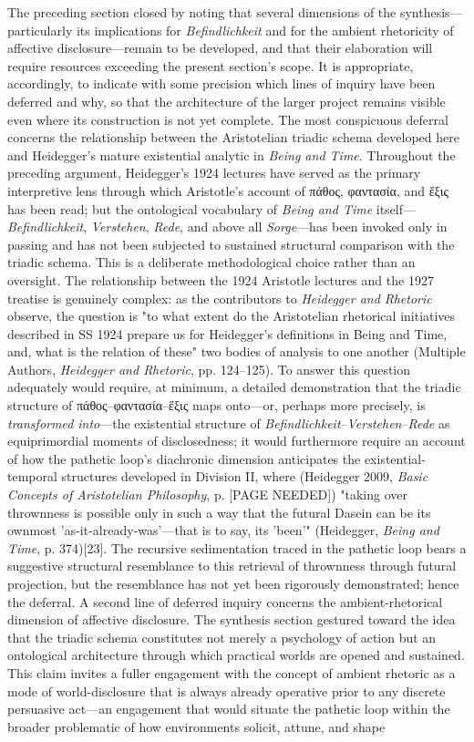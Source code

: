 \documentclass{article}
\begin{document}
The preceding section closed by noting that several dimensions of the synthesis—particularly its implications for \textit{Befindlichkeit} and for the ambient rhetoricity of affective disclosure—remain to be developed, and that their elaboration will require resources exceeding the present section's scope. It is appropriate, accordingly, to indicate with some precision which lines of inquiry have been deferred and why, so that the architecture of the larger project remains visible even where its construction is not yet complete. The most conspicuous deferral concerns the relationship between the Aristotelian triadic schema developed here and Heidegger's mature existential analytic in \textit{Being and Time}. Throughout the preceding argument, Heidegger's 1924 lectures have served as the primary interpretive lens through which Aristotle's account of πάθος, φαντασία, and ἕξις has been read; but the ontological vocabulary of \textit{Being and Time} itself—\textit{Befindlichkeit}, \textit{Verstehen}, \textit{Rede}, and above all \textit{Sorge}—has been invoked only in passing and has not been subjected to sustained structural comparison with the triadic schema. This is a deliberate methodological choice rather than an oversight. The relationship between the 1924 Aristotle lectures and the 1927 treatise is genuinely complex: as the contributors to \textit{Heidegger and Rhetoric} observe, the question is "to what extent do the Aristotelian rhetorical initiatives described in SS 1924 prepare us for Heidegger's definitions in Being and Time, and, what is the relation of these" two bodies of analysis to one another (Multiple Authors, \textit{Heidegger and Rhetoric}, pp. 124–125). To answer this question adequately would require, at minimum, a detailed demonstration that the triadic structure of πάθος–φαντασία–ἕξις maps onto—or, perhaps more precisely, is \textit{transformed into}—the existential structure of \textit{Befindlichkeit}–\textit{Verstehen}–\textit{Rede} as equiprimordial moments of disclosedness; it would furthermore require an account of how the pathetic loop's diachronic dimension anticipates the existential-temporal structures developed in Division II, where (Heidegger 2009, \textit{Basic Concepts of Aristotelian Philosophy}, p. [PAGE NEEDED]) "taking over thrownness is possible only in such a way that the futural Dasein can be its ownmost 'as-it-already-was'—that is to say, its 'been'" (Heidegger, \textit{Being and Time}, p. 374)[23]. The recursive sedimentation traced in the pathetic loop bears a suggestive structural resemblance to this retrieval of thrownness through futural projection, but the resemblance has not yet been rigorously demonstrated; hence the deferral. A second line of deferred inquiry concerns the ambient-rhetorical dimension of affective disclosure. The synthesis section gestured toward the idea that the triadic schema constitutes not merely a psychology of action but an ontological architecture through which practical worlds are opened and sustained. This claim invites a fuller engagement with the concept of ambient rhetoric as a mode of world-disclosure that is always already operative prior to any discrete persuasive act—an engagement that would situate the pathetic loop within the broader problematic of how environments solicit, attune, and shape 
\end{document}
